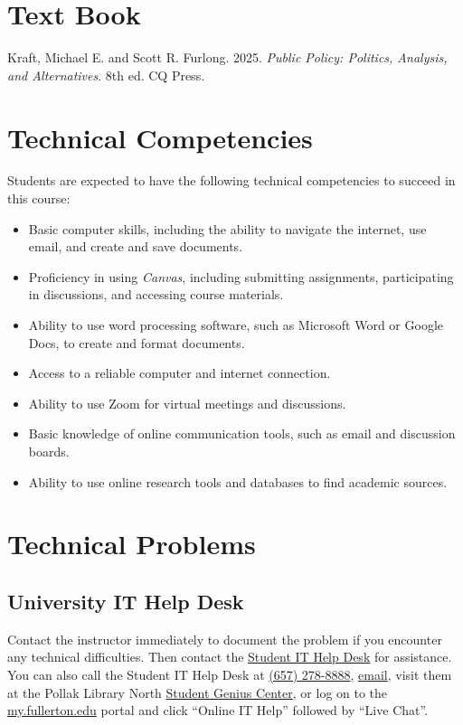 \documentclass[12pt, letterpaper]{article}
\begin{document}
\section*{Text Book}

Kraft, Michael E. and Scott R. Furlong. 2025. \emph{Public Policy: Politics, Analysis, and Alternatives}. 8th ed. CQ Press.

\section*{Technical Competencies}

Students are expected to have the following technical competencies to succeed in this course:
\begin{itemize}
    \item Basic computer skills, including the ability to navigate the internet, use email, and create and save documents.
    \item Proficiency in using \emph{Canvas}, including submitting assignments, participating in discussions, and accessing course materials.
    \item Ability to use word processing software, such as Microsoft Word or Google Docs, to create and format documents.
    \item Access to a reliable computer and internet connection.
    \item Ability to use Zoom for virtual meetings and discussions.
    \item Basic knowledge of online communication tools, such as email and discussion boards.
    \item Ability to use online research tools and databases to find academic sources.
\end{itemize}

\section*{Technical Problems}

\subsection*{University IT Help Desk}

Contact the instructor immediately to document the problem if you encounter any technical difficulties. Then contact the \href{http://www.fullerton.edu/it/students/helpdesk/index.php}{Student IT Help Desk} for assistance. You can also call the Student IT Help Desk at \href{tel:+16572788888}{(657) 278-8888}, \href{mailto:StudentITHelpDesk@fullerton.edu}{email}, visit them at the Pollak Library North \href{http://www.fullerton.edu/it/students/sgc/index.php}{Student Genius Center}, or log on to the \href{http://my.fullerton.edu/}{my.fullerton.edu} portal and click ``Online IT Help'' followed by ``Live Chat''.
\end{document}
